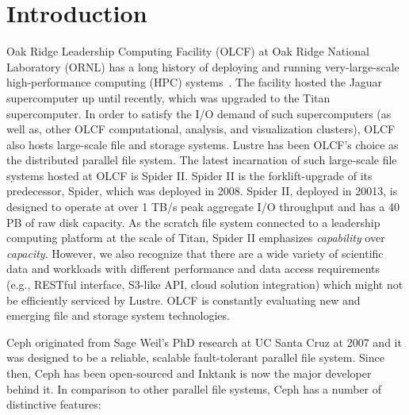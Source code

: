 \section{Introduction}

Oak Ridge Leadership Computing Facility (OLCF) at Oak Ridge National Laboratory
(ORNL) has a long history of deploying and running very-large-scale
high-performance computing (HPC) systems~\cite{top500-ornl}. The facility
hosted the Jaguar supercomputer up until recently, which was upgraded to the
Titan supercomputer. In order to satisfy the I/O demand of such supercomputers
(as well as, other OLCF computational, analysis, and visualization clusters),
OLCF also hosts large-scale file and storage systems. Lustre has been OLCF's
choice as the distributed parallel file system.  The latest incarnation of such
large-scale file systems hosted at OLCF is Spider II\cite{spider2}. Spider II
is the forklift-upgrade of its predecessor, Spider, which was deployed in 2008.
Spider II, deployed in 20013, is designed to operate at over 1 TB/s peak
aggregate I/O throughput and has a 40 PB of raw disk capacity. As the scratch
file system connected to a leadership computing platform at the scale of Titan,
Spider II emphasizes \textit{capability} over \textit{capacity}. However, we
also recognize that there are a wide variety of scientific data and workloads
with different performance and data access requirements (e.g., RESTful
interface, S3-like API, cloud solution integration) which might not be
efficiently serviced by Lustre. OLCF is constantly evaluating new and emerging
file and storage system technologies.  

Ceph\cite{Weil:2006:Ceph} originated from Sage Weil's PhD research at UC Santa
Cruz at 2007 and it was designed to be a reliable, scalable fault-tolerant
parallel file system.  Since then, Ceph has been open-sourced and Inktank is
now the major developer behind it.  In comparison to other parallel file
systems, Ceph has a number of distinctive features:

